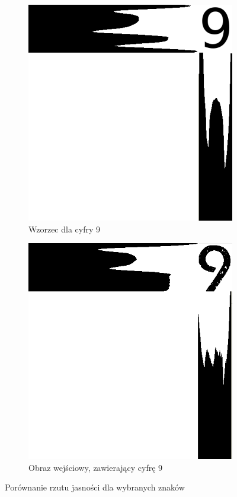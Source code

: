 \begin{figure}
\begin{subfigure}[b]{0.42\textwidth}
    \includegraphics[width=\textwidth]{img/rzut-wzorzec-9}
    \caption{Wzorzec dla cyfry 9}
    \label{fig:rzut_wzorzec_9}
  \end{subfigure}
  \begin{subfigure}[b]{0.44\textwidth}
    \includegraphics[width=\textwidth]{img/rzut-in-9}
    \caption{Obraz wejściowy, zawierający cyfrę 9}
    \label{fig:rzut_in_9}
  \end{subfigure}
  \caption{Porównanie rzutu jasności dla wybranych znaków}
    \label{fig:rzut_jasnosci_ocr}
\end{figure}


